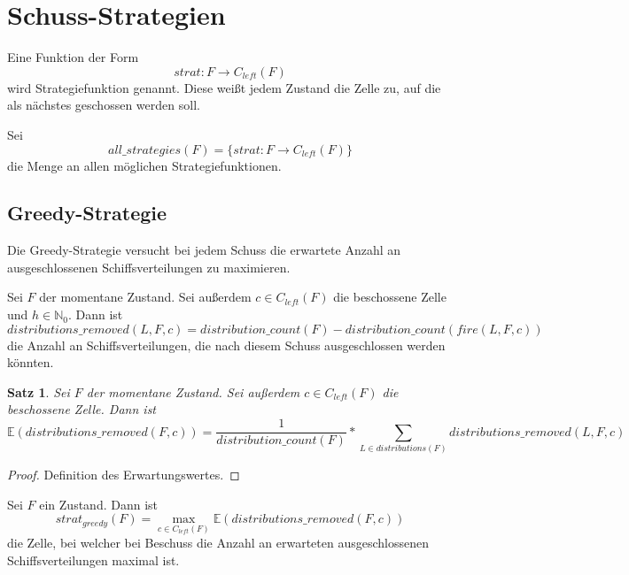 \documentclass[a4paper,12pt]{llncs}
\newcommand{\N}{{\mathbb{N}}}
\numberwithin{equation}{section}
\newtheorem{satz}{Satz}
\begin{document}
\section{Schuss-Strategien}

\begin{definition}
Eine Funktion der Form
\[
strat \colon F \rightarrow C_{left}(F)
\]
wird Strategiefunktion genannt. Diese weißt jedem Zustand die Zelle zu, auf die als nächstes geschossen werden soll.
\end{definition}

\begin{definition}
Sei
\[
all\_strategies(F)=\{ strat \colon F \rightarrow C_{left}(F) \}
\]
die Menge an allen möglichen Strategiefunktionen.
\end{definition}


\subsection{Greedy-Strategie}
Die Greedy-Strategie versucht bei jedem Schuss die erwartete Anzahl an ausgeschlossenen Schiffsverteilungen zu maximieren.

\begin{definition}
Sei $F$ der momentane Zustand.
Sei außerdem $c \in C_{left}(F)$ die beschossene Zelle und $h \in \N_0$.
Dann ist
\[
distributions\_removed(L, F, c)=distribution\_count(F) - distribution\_count(fire(L, F,c))
\]
die Anzahl an Schiffsverteilungen, die nach diesem Schuss ausgeschlossen werden könnten.
\end{definition}

\begin{satz}
Sei $F$ der momentane Zustand.
Sei außerdem $c \in C_{left}(F)$ die beschossene Zelle.
Dann ist
\[
\mathds{E}(distributions\_removed(F,c))=\frac{1}{distribution\_count(F)} * \sum_{L \in distributions(F)} distributions\_removed(L, F, c)
\]
\end{satz}

\begin{proof}
Definition des Erwartungswertes.
\end{proof}

\begin{definition}
Sei $F$ ein Zustand.
Dann ist
\[
strat_{greedy}(F)=\max_{c \in C_{left}(F)} \mathds{E}(distributions\_removed(F,c))
\]
die Zelle, bei welcher bei Beschuss die Anzahl an erwarteten ausgeschlossenen Schiffsverteilungen maximal ist.
\end{definition}
\end{document}
